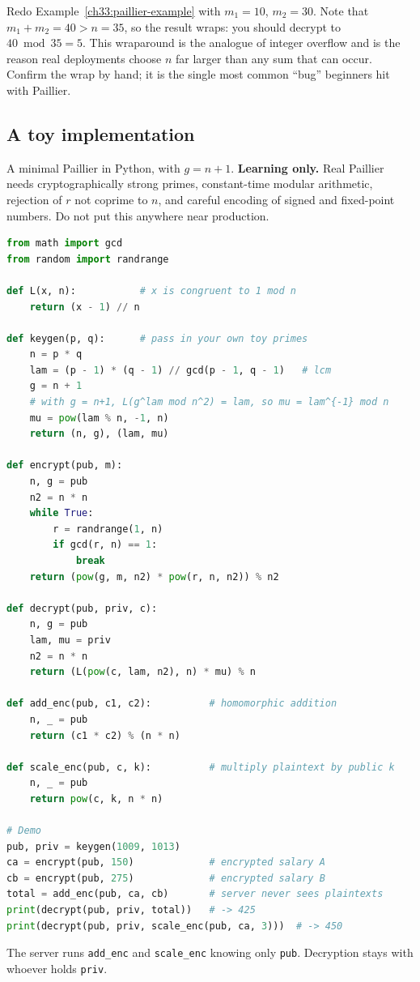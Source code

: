 \begin{labbox}
Redo Example~\ref{ch33:paillier-example} with $m_1 = 10$, $m_2 = 30$. Note that $m_1 + m_2 = 40 > n = 35$, so the result wraps: you should decrypt to $40 \bmod 35 = 5$. This wraparound is the analogue of integer overflow and is the reason real deployments choose $n$ far larger than any sum that can occur. Confirm the wrap by hand; it is the single most common ``bug'' beginners hit with Paillier.
\end{labbox}

\subsection{A toy implementation}
\label{ch33:paillier-code}

\begin{implementbox}
A minimal Paillier in Python, with $g=n+1$. \textbf{Learning only.} Real Paillier needs cryptographically strong primes, constant-time modular arithmetic, rejection of $r$ not coprime to $n$, and careful encoding of signed and fixed-point numbers. Do not put this anywhere near production.
\begin{lstlisting}[language=Python]
from math import gcd
from random import randrange

def L(x, n):           # x is congruent to 1 mod n
    return (x - 1) // n

def keygen(p, q):      # pass in your own toy primes
    n = p * q
    lam = (p - 1) * (q - 1) // gcd(p - 1, q - 1)   # lcm
    g = n + 1
    # with g = n+1, L(g^lam mod n^2) = lam, so mu = lam^{-1} mod n
    mu = pow(lam % n, -1, n)
    return (n, g), (lam, mu)

def encrypt(pub, m):
    n, g = pub
    n2 = n * n
    while True:
        r = randrange(1, n)
        if gcd(r, n) == 1:
            break
    return (pow(g, m, n2) * pow(r, n, n2)) % n2

def decrypt(pub, priv, c):
    n, g = pub
    lam, mu = priv
    n2 = n * n
    return (L(pow(c, lam, n2), n) * mu) % n

def add_enc(pub, c1, c2):          # homomorphic addition
    n, _ = pub
    return (c1 * c2) % (n * n)

def scale_enc(pub, c, k):          # multiply plaintext by public k
    n, _ = pub
    return pow(c, k, n * n)

# Demo
pub, priv = keygen(1009, 1013)
ca = encrypt(pub, 150)             # encrypted salary A
cb = encrypt(pub, 275)             # encrypted salary B
total = add_enc(pub, ca, cb)       # server never sees plaintexts
print(decrypt(pub, priv, total))   # -> 425
print(decrypt(pub, priv, scale_enc(pub, ca, 3)))  # -> 450
\end{lstlisting}
The server runs \texttt{add\_enc} and \texttt{scale\_enc} knowing only \texttt{pub}. Decryption stays with whoever holds \texttt{priv}.
\end{implementbox}

